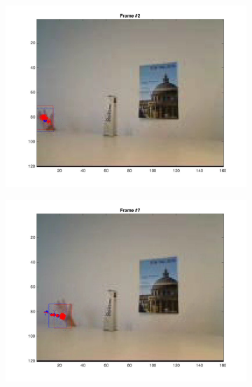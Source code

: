 \documentclass{ethz_report}
\begin{document}
\begin{figure}[h]
    \centering
    \begin{subfigure}[b]{.25\textwidth}
        \centering
        \includegraphics[width=1\linewidth]{images/video2_noise_low_1}
    \end{subfigure}%
    \begin{subfigure}[b]{.25\textwidth}
        \centering
        \includegraphics[width=1\linewidth]{images/video2_noise_low_6}
    \end{subfigure}%
    \begin{subfigure}[b]{.25\textwidth}
        \centering

\end{subfigure}
\end{figure}
\end{document}
